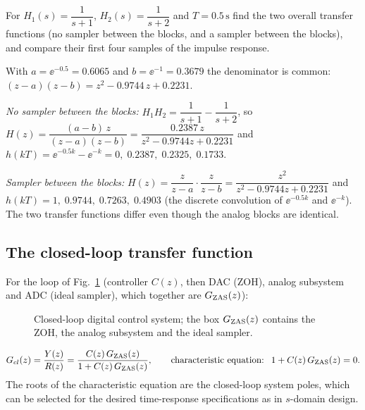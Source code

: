 \begin{problem}
For $H_1(s)=\dfrac{1}{s+1}$, $H_2(s)=\dfrac{1}{s+2}$ and $T=0.5\,\mathrm{s}$ find the two overall transfer
functions (no sampler between the blocks, and a sampler between the blocks), and compare their first four
samples of the impulse response.
\end{problem}
\begin{solution}
With $a=\ee^{-0.5}=0.6065$ and $b=\ee^{-1}=0.3679$ the denominator is common:
$(z-a)(z-b)=z^{2}-0.9744\,z+0.2231$.\par
\emph{No sampler between the blocks:} $H_1H_2=\dfrac{1}{s+1}-\dfrac{1}{s+2}$, so
$H(z)=\dfrac{(a-b)\,z}{(z-a)(z-b)}=\dfrac{0.2387\,z}{z^{2}-0.9744z+0.2231}$ and
$h(kT)=\ee^{-0.5k}-\ee^{-k}=0,\;0.2387,\;0.2325,\;0.1733$.\par
\emph{Sampler between the blocks:} $H(z)=\dfrac{z}{z-a}\cdot\dfrac{z}{z-b}=\dfrac{z^{2}}{z^{2}-0.9744z+0.2231}$ and
$h(kT)=1,\;0.9744,\;0.7263,\;0.4903$ (the discrete convolution of $\ee^{-0.5k}$ and $\ee^{-k}$).
The two transfer functions differ even though the analog blocks are identical.
\end{solution}

\subsection{The closed-loop transfer function}
For the loop of Fig.~\ref{fig:closedloop} (controller $C(z)$, then DAC (ZOH), analog subsystem and ADC
(ideal sampler), which together are $G_{\mathrm{ZAS}}(z)$):

\begin{figure}[ht]
\centering
\resizebox{\linewidth}{!}{\figClosedLoopExpanded}
\caption{Closed-loop digital control system; the box $G_{\mathrm{ZAS}}(z)$ contains the ZOH, the analog
subsystem and the ideal sampler.}\label{fig:closedloop}
\end{figure}

\begin{equation}
  G_{cl}(z)=\frac{Y(z)}{R(z)}=\frac{C(z)\,G_{\mathrm{ZAS}}(z)}{1+C(z)\,G_{\mathrm{ZAS}}(z)},
  \qquad\text{characteristic equation: }\ 1+C(z)\,G_{\mathrm{ZAS}}(z)=0.
\end{equation}
The roots of the characteristic equation are the closed-loop system poles, which can be selected for the
desired time-response specifications as in $s$-domain design.

